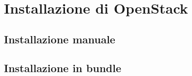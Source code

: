\section{Installazione di OpenStack}

\subsection{Installazione manuale}

\subsection{Installazione in bundle}
